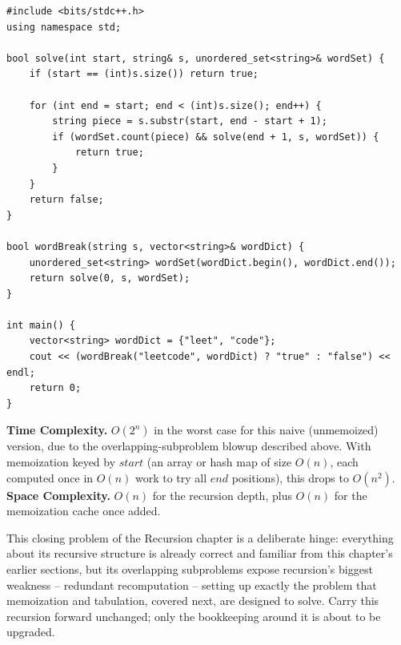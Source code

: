 \begin{lstlisting}
#include <bits/stdc++.h>
using namespace std;

bool solve(int start, string& s, unordered_set<string>& wordSet) {
    if (start == (int)s.size()) return true;

    for (int end = start; end < (int)s.size(); end++) {
        string piece = s.substr(start, end - start + 1);
        if (wordSet.count(piece) && solve(end + 1, s, wordSet)) {
            return true;
        }
    }
    return false;
}

bool wordBreak(string s, vector<string>& wordDict) {
    unordered_set<string> wordSet(wordDict.begin(), wordDict.end());
    return solve(0, s, wordSet);
}

int main() {
    vector<string> wordDict = {"leet", "code"};
    cout << (wordBreak("leetcode", wordDict) ? "true" : "false") << endl;
    return 0;
}
\end{lstlisting}

\begin{complexitybox}
\textbf{Time Complexity.} $O(2^n)$ in the worst case for this naive
(unmemoized) version, due to the overlapping-subproblem blowup described
above. With memoization keyed by $\textit{start}$ (an array or hash map
of size $O(n)$, each computed once in $O(n)$ work to try all
$\textit{end}$ positions), this drops to $O(n^2)$.
\textbf{Space Complexity.} $O(n)$ for the recursion depth, plus
$O(n)$ for the memoization cache once added.
\end{complexitybox}

\begin{takeawaybox}
This closing problem of the Recursion chapter is a deliberate hinge:
everything about its recursive structure is already correct and familiar
from this chapter's earlier sections, but its overlapping subproblems
expose recursion's biggest weakness -- redundant recomputation -- setting
up exactly the problem that memoization and tabulation, covered next, are
designed to solve. Carry this recursion forward unchanged; only the
bookkeeping around it is about to be upgraded.
\end{takeawaybox}
